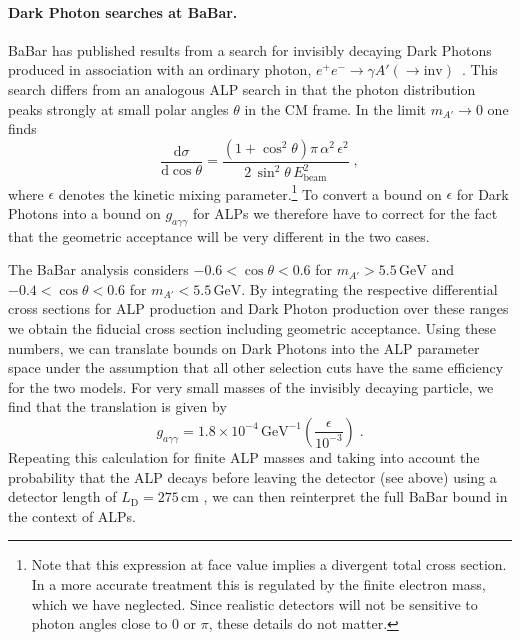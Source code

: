 \documentclass[11pt,a4paper]{article}
\newcommand{\ga}{g_{a\gamma\gamma}}
\def \babar {BaBar\xspace}
\begin{document}
\paragraph{Dark Photon searches at \babar.}
\babar has published results from a search for invisibly decaying Dark Photons produced in association with an ordinary photon, $e^+ e^- \to \gamma A' (\to \text{inv})$~\cite{Lees:2017lec}. This search differs from an analogous ALP search in that the photon distribution peaks strongly at small polar angles $\theta$ in the CM frame. In the limit $m_{A'} \to 0$ one finds~\cite{Izaguirre:2013uxa}
\begin{equation}
\frac{\mathrm{d}\sigma}{\mathrm d \cos \theta} = \frac{(1 + \cos^2 \theta) \pi \, \alpha^2 \, \epsilon^2}{2 \, \sin^2 \theta \, E_\text{beam}^2} \; ,
\end{equation}
where $\epsilon$ denotes the kinetic mixing parameter.\footnote{Note that this expression at face value implies a divergent total cross section. In a more accurate treatment this is regulated by the finite electron mass, which we have neglected. Since realistic detectors will not be sensitive to photon angles close to $0$ or $\pi$, these details do not matter.} To convert a bound on $\epsilon$ for Dark Photons into a bound on $\ga$ for ALPs we therefore have to correct for the fact that the geometric acceptance will be very different in the two cases.

The \babar analysis considers $-0.6 < \cos \theta < 0.6$ for $m_{A'} > 5.5\,\text{GeV}$ and $-0.4 < \cos \theta < 0.6$ for $m_{A'} < 5.5\,\text{GeV}$. By integrating the respective differential cross sections for ALP production and Dark Photon production over these ranges we obtain the fiducial cross section including geometric acceptance. Using these numbers, we can translate bounds on Dark Photons into the ALP parameter space under the assumption that all other selection cuts have the same efficiency for the two models. For very small masses of the invisibly decaying particle, we find that the translation is given by
\begin{equation}
 \ga = 1.8 \times 10^{-4} \, \text{GeV}^{-1} \left(\frac{\epsilon}{10^{-3}}\right) \; . 
\end{equation}
Repeating this calculation for finite ALP masses and taking into account the probability that the ALP decays before leaving the detector (see above) using a detector length of $L_\mathrm{D}=275$\,cm \cite{Aubert:2001tu}, we can then reinterpret the full \babar bound in the context of ALPs.
\end{document}

